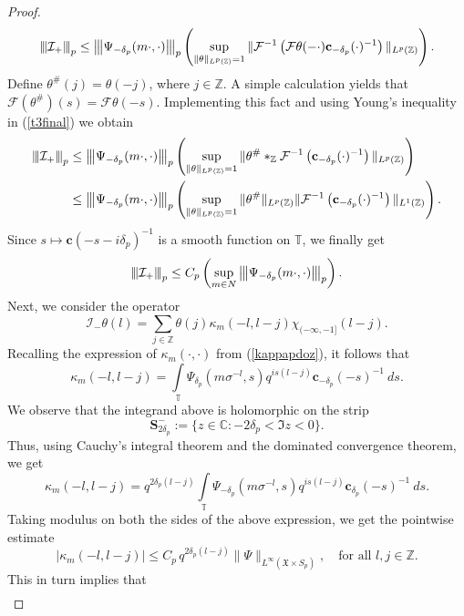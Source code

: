 \documentclass[12pt,reqno]{amsart}
\newcommand{\vertiii}[1]{{\left\vert\kern-0.25ex\left\vert\kern-0.25ex\left\vert #1 
		\right\vert\kern-0.25ex\right\vert\kern-0.25ex\right\vert}}
\theoremstyle{definition}
\theoremstyle{definition}
\numberwithin{equation}{section}
\begin{document}
\begin{proof}
\begin{equation}
		\vertiii{\mathcal{I}_+}_{p}\leq \vertiii{\Psi_{-\delta_{p}}(m\cdot,\cdot)}_{p}\left(\sup\limits_{\|\theta\|_{L^{p}(\mathbb{Z})}=1} \|\mathcal{F}^{-1}\left(\mathcal{F}\theta(-\cdot)\mathbf{c}_{-\delta_{p}}(\cdot)^{-1}\right)\|_{L^{p}(\mathbb{Z})} \right).
	\end{equation}
Define $\theta^{\#}(j)=\theta(-j)$, where $j\in\mathbb{Z}$. A simple calculation yields that  $\mathcal{F}(\theta^{\#})(s)=\mathcal{F}\theta(-s)$. Implementing this fact and using Young's inequality in (\ref{t3final}) we   obtain
	\begin{align*}
		\vertiii{\mathcal{I}_+}_{p}&\leq \vertiii{\Psi_{-\delta_{p}}(m\cdot,\cdot)}_{p}\left(\sup\limits_{\|\theta\|_{L^{p}(\mathbb{Z})}=1} \|\theta^{\#}\ast_{\mathbb{Z}}\mathcal{F}^{-1}\left(\mathbf{c}_{-\delta_{p}}(\cdot)^{-1}\right)\|_{L^{p}(\mathbb{Z})} \right)\\
		&\leq \vertiii{\Psi_{-\delta_{p}}(m\cdot,\cdot)}_{p}\left(\sup\limits_{\|\theta\|_{L^{p}(\mathbb{Z})}=1} \|\theta^{\#}\|_{L^{p}(\mathbb{Z})}\|\mathcal{F}^{-1}\left(\mathbf{c}_{-\delta_{p}}(\cdot)^{-1}\right)\|_{L^{1}(\mathbb{Z})} \right).
	\end{align*}
	Since $s\mapsto\mathbf{c}(-s-i\delta_{p})^{-1}$ is a smooth function on $\mathbb{T}$, we finally get
\begin{equation}\label{eqn_op_norm_est_of_I_0}
\vertiii{\mathcal{I}_+}_{p}\leq C_{p}\left(\sup\limits_{m\in N}\vertiii{\Psi_{-\delta_{p}}(m\cdot,\cdot)}_{p}\right).
	\end{equation}
	Next, we consider the operator
	$$\mathcal{I}_-\theta(l)=\sum\limits_{j\in\mathbb{Z}}\theta(j)\kappa_{m}(-l,l-j)\chi_{(-\infty,-1]}(l-j).$$
Recalling the expression of $\kappa_{m}(\cdot,\cdot)$ from (\ref{kappapdoz}), it follows that
	$$\kappa_{m}(-l,l-j)=\int\limits_{\mathbb{T}}\Psi_{\delta_{p}}(m\sigma^{-l},s)q^{is(l-j)}\mathbf{c}_{-\delta_{p}}(-s)^{-1}~ds.$$
We observe that the integrand above  is holomorphic on the strip
	$$\textbf{S}^{-}_{2\delta_{p}}:=\{z\in\mathbb{C}:  -2\delta_{p}<\Im z<0\}.$$
	Thus, using Cauchy's integral theorem and the dominated convergence theorem, we get
	$$\kappa_{m}(-l,l-j)=q^{2\delta_{p}(l-j)}\int\limits_{\mathbb{T}}\Psi_{-\delta_{p}}(m\sigma^{-l},s)q^{is(l-j)}\mathbf{c}_{\delta_{p}}(-s)^{-1}~ds.$$
Taking modulus on both the sides of the above expression, we get the pointwise estimate
	$$|\kappa_{m}(-l,l-j)|\leq C_{p}\,q^{2\delta_{p}(l-j)}\|\Psi\|_{L^{\infty}(\mathfrak{X}\times S_{p})},\quad\text{for all }l,j\in\mathbb{Z}.$$
This in turn implies that
	\begin{align}\label{t4final}

\end{align}
\end{proof}
\end{document}
